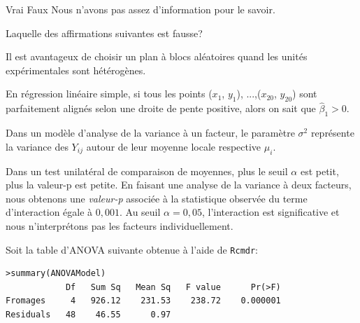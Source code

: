 \begin{questions}
\begin{parts}
\medskip   \begin{oneparcheckboxes}
        \choice Vrai 
        \CorrectChoice Faux
        \choice Nous n'avons pas assez d'information pour le savoir.
\medskip    \end{oneparcheckboxes}
    


\end{parts}
\medskip

\question[3]\label{QCManovaReg}

Laquelle des affirmations suivantes est fausse?

\medskip

\begin{checkboxes}
\choice Il est avantageux de choisir un plan à blocs aléatoires quand les unités expérimentales sont hétérogènes.

\CorrectChoice En régression linéaire simple, si tous les points ($x_1$, $y_1$), ...,($x_{20}$, $y_{20}$) sont parfaitement alignés selon une droite de pente positive, alors on sait que $\widehat{\beta}_1 >0$.


\choice Dans un modèle d’analyse de la variance à un facteur, le paramètre $\sigma^2$ représente la variance
des $Y_{ij}$ autour de leur moyenne locale respective $\mu_i$.

\correctchoice Dans un test unilatéral de comparaison de moyennes, plus le seuil $\alpha$ est petit, plus la valeur-p est petite.
\choice En faisant une analyse de la variance à deux facteurs, nous obtenons une \textit{valeur-p} associée à la statistique observée du terme d'interaction égale à $0,001$. Au seuil $\alpha = 0,05$, l'interaction est significative et nous n'interprétons pas les facteurs individuellement.


\end{checkboxes}

\medskip
\question[3] Soit la table d'ANOVA suivante obtenue à l'aide de \texttt{Rcmdr}:
\begin{verbatim}
>summary(ANOVAModel)
            Df   Sum Sq   Mean Sq   F value      Pr(>F)    
Fromages     4   926.12    231.53    238.72    0.000001 
Residuals   48    46.55      0.97                      
\end{verbatim}


\end{questions}

